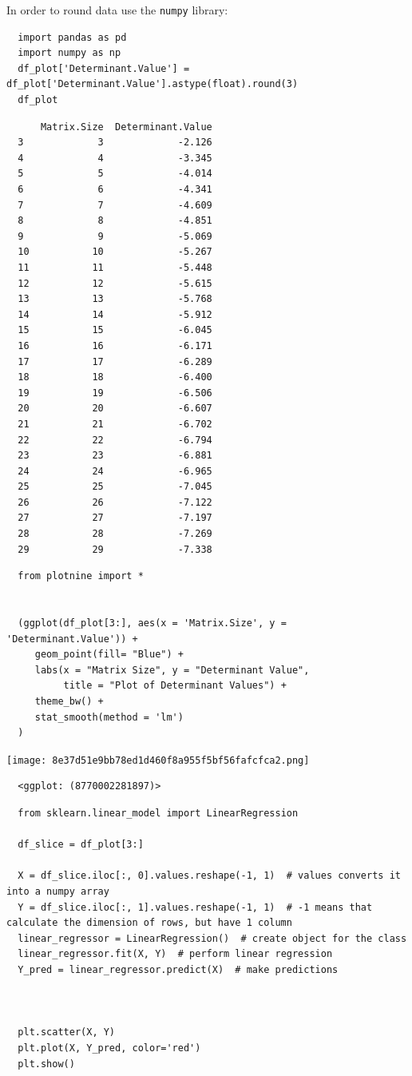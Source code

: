 \documentclass[11pt]{article}
\begin{document}
In order to round data use the \texttt{numpy} library:

\begin{verbatim}
  import pandas as pd
  import numpy as np
  df_plot['Determinant.Value'] = df_plot['Determinant.Value'].astype(float).round(3)
  df_plot
\end{verbatim}

\begin{verbatim}
      Matrix.Size  Determinant.Value
  3             3             -2.126
  4             4             -3.345
  5             5             -4.014
  6             6             -4.341
  7             7             -4.609
  8             8             -4.851
  9             9             -5.069
  10           10             -5.267
  11           11             -5.448
  12           12             -5.615
  13           13             -5.768
  14           14             -5.912
  15           15             -6.045
  16           16             -6.171
  17           17             -6.289
  18           18             -6.400
  19           19             -6.506
  20           20             -6.607
  21           21             -6.702
  22           22             -6.794
  23           23             -6.881
  24           24             -6.965
  25           25             -7.045
  26           26             -7.122
  27           27             -7.197
  28           28             -7.269
  29           29             -7.338
\end{verbatim}

\begin{verbatim}
  from plotnine import *


  (ggplot(df_plot[3:], aes(x = 'Matrix.Size', y = 'Determinant.Value')) +
     geom_point(fill= "Blue") +
     labs(x = "Matrix Size", y = "Determinant Value",
          title = "Plot of Determinant Values") +
     theme_bw() +
     stat_smooth(method = 'lm')
  )
\end{verbatim}

\begin{center}
\texttt{[image: 8e37d51e9bb78ed1d460f8a955f5bf56fafcfca2.png]}
\end{center}

\begin{verbatim}
  <ggplot: (8770002281897)>
\end{verbatim}

\begin{verbatim}
  from sklearn.linear_model import LinearRegression

  df_slice = df_plot[3:]

  X = df_slice.iloc[:, 0].values.reshape(-1, 1)  # values converts it into a numpy array
  Y = df_slice.iloc[:, 1].values.reshape(-1, 1)  # -1 means that calculate the dimension of rows, but have 1 column
  linear_regressor = LinearRegression()  # create object for the class
  linear_regressor.fit(X, Y)  # perform linear regression
  Y_pred = linear_regressor.predict(X)  # make predictions



  plt.scatter(X, Y)
  plt.plot(X, Y_pred, color='red')
  plt.show()
\end{verbatim}
\end{document}
